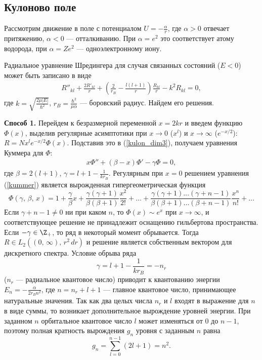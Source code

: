 \documentclass[a4paper
]{article}
\begin{document}
\subsection{Кулоново поле}
Рассмотрим движение в поле с потенциалом $U=-\frac{\alpha}{r}$, где $\alpha
>0$ отвечает притяжению, $\alpha<0$ --- отталкиванию. При $\alpha=e^2$
это соответствует атому водорода, при $\alpha=Ze^2$ --- одноэлектронному
иону. \par
Радиальное уравнение Шредингера для случая связанных состояний ($E<0$)
может быть записано в виде
\begin{align}
\label{kulon_dim3}
R''_{kl}+\frac{2R'_{kl}}{r}+\left(\frac{2}{r_B}-\frac{l(l+1)}{r}\right)
\frac{R_{kl}}{r}-k^2R_{kl}=0,
\end{align}
где $k=\sqrt{\frac{2\mu|E|}{\hbar^2}}$, $r_B=\frac{\hbar^2}{\mu\alpha}$
--- боровский радиус. Найдем его решения. \par
{\bf Способ 1.} Перейдем к безразмерной переменной $x=2kr$ и введем
функцию $\Phi(x)$, выделив регулярные асимптотики при $x\rightarrow 0$
($x^l$) и $x\rightarrow \infty$ ($e^{-x/2}$): $R=Nx^le^{-x/2}\Phi(x)$.
Подставив это в (\ref{kulon_dim3}), получаем уравнения Куммера для
$\Phi$:
\begin{align}
\label{kummer}
x\Phi''+(\beta-x)\Phi'-\gamma\Phi=0,
\end{align}
где $\beta=2(l+1)$, $\gamma=l+1-\frac{1}{kr_B}$. Регулярным при $x=0$
решением уравнения (\ref{kummer}) является вырожденная гипергеометрическая
функция $$\Phi(\gamma, \, \beta, \, x)=1+\frac{\gamma}{\beta}x+\frac{\gamma
(\gamma+1)}{\beta(\beta+1)}\frac{x^2}{2!}+\dots+\frac{\gamma(\gamma+1)\dots
(\gamma+n-1)}{\beta(\beta+1)\dots(\beta+n-1)}\frac{x^n}{n!}+\dots$$
Если $\gamma+n-1\ne 0$ ни при каком $n$, то $\Phi(x)\sim e^x$ при $x
\rightarrow \infty$, и соответствующее решение не принадлежит оснащению
гильбертова пространства. Если $-\gamma\in \Z_+$, то ряд в некоторый момент
обрывается. Тогда $R\in L_2((0, \, \infty), \, r^2\, dr)$ и решение
является собственным вектором для дискретного спектра. Условие обрыва
ряда $$\gamma=l+1-\frac{1}{kr_B}=-n_r$$ ($n_r$ --- радиальное квантовое
число) приводит к квантованию энергии $E_n=-\frac{\alpha}{2r_Bn^2}$, где
$n=n_r+l+1$ --- главное квантовое число, принимающее натуральные
значения. Так как два целых числа $n_r$ и $l$ входят в выражение для $n$
в виде суммы, то возникает дополнительное вырождение уровней энергии.
При заданном $n$ орбитальное квантовое число $l$ может изменяться от 0
до $n-1$, поэтому полная кратность вырождения $g_n$ уровня с заданным
$n$ равна $$g_n=\sum \limits_{l=0}^{n-1}(2l+1)=n^2.$$
\end{document}
